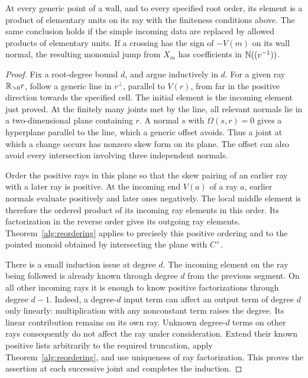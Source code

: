 \begin{proposition}
\label{wall:factors}
At every generic point of a wall, and to every specified root order,
its element is a product of elementary units on its ray with the
finiteness conditions above.  The same conclusion holds if the
simple incoming data are replaced by allowed products of elementary
units.  If a crossing has the sign of $-V(m)$ on its wall normal,
the resulting monomial jump from $X_m$ has coefficients in
$\mathbb N((v^{-1}))$.
\end{proposition}

\begin{proof}
Fix a root-degree bound $d$, and argue inductively in $d$.  For a
given ray $\mathbb R_{>0}r$, follow a generic line in $r^\perp$, parallel
to $V(r)$, from far in the positive direction towards the specified
cell.  The initial element is the incoming element just proved.
At the finitely many joints met by the line, all relevant normals
lie in a two-dimensional plane containing $r$.  A normal $s$ with
$\Omega(s,r)=0$ gives a hyperplane parallel to the line, which a
generic offset avoids.  Thus a joint at which a change occurs has
nonzero skew form on its plane.  The offset can also avoid every
intersection involving three independent normals.

Order the positive rays in this plane so that the skew pairing of
an earlier ray with a later ray is positive.  At the incoming end
$V(a)$ of a ray $a$, earlier normals evaluate positively and later
ones negatively.  The local middle element is therefore the
ordered product of its incoming ray elements in this order.  Its
factorization in the reverse order gives its outgoing ray elements.
Theorem~\ref{alg:reordering} applies to precisely this positive
ordering and to the pointed monoid obtained by intersecting the
plane with $C^+$.

There is a small induction issue at degree $d$.  The incoming
element on the ray being followed is already known through degree
$d$ from the previous segment.  On all other incoming rays it is
enough to know positive factorizations through degree $d-1$.
Indeed, a degree-$d$ input term can affect an output term of degree
$d$ only linearly: multiplication with any nonconstant term raises
the degree.  Its linear contribution remains on its own ray.
Unknown degree-$d$ terms on other rays consequently do not affect
the ray under consideration.  Extend their known positive lists
arbitrarily to the required truncation, apply
Theorem~\ref{alg:reordering}, and use uniqueness of ray
factorization.  This proves the assertion at each successive joint
and completes the induction.


\end{proof}
